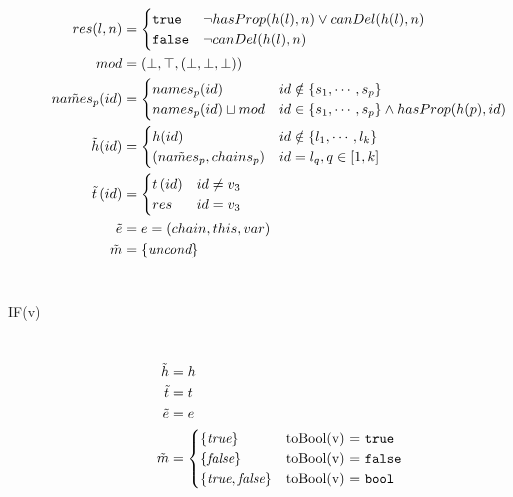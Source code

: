 \begin{description}
\[\begin{aligned}
    res(l, n) &= \begin{cases}
      \mathtt{true} & \lnot hasProp(h(l), n) \lor canDel(h(l), n) \\
      \mathtt{false} & \lnot canDel(h(l), n) \\
    \end{cases} \\
    mod & = (\bot, \top, (\bot, \bot, \bot)) \\
    \tilde{names_p}(id) &= \begin{cases}
      names_p(id) & id \notin \{s_1, \cdots, s_p\} \\
      names_p(id) \sqcup mod & id \in \{s_1, \cdots, s_p\} \land
      hasProp(h(p), id) \\
    \end{cases} \\
    \tilde{h}(id) &= \begin{cases}
      h(id) & id \notin \{l_1, \cdots, l_k \} \\
      (\tilde{names_p}, chains_p) & id = l_q, q \in [1, k] \\
    \end{cases} \\ 
    \tilde{t}\left( id \right) &= 
      \begin{cases}
	 t\left( id \right) & id \neq v_3 \\
	 res & id = v_3 \\
      \end{cases} \\ 
    \tilde{e} &= e = (chain, this, var) \\ 
  \tilde{m} &= \{\emph{uncond}\} \\
  \end{aligned}
  \]
  \\
  \item[{\small\ttfamily IF(v)}] ~\\%
  \[
  \begin{aligned}
    \tilde{h} &= h\\
    \tilde{t} &= t\\
    \tilde{e} &= e\\
    \tilde{m} &= \begin{cases}
      \{\emph{true}\} & $toBool(v) = \texttt{true}$\\
      \{\emph{false}\} & $toBool(v) = \texttt{false}$\\
      \{\emph{true}, \emph{false}\} & $toBool(v) = \texttt{bool}$\\
    \end{cases} \\
  \end{aligned}
  \]
  \\
   

\end{description}
